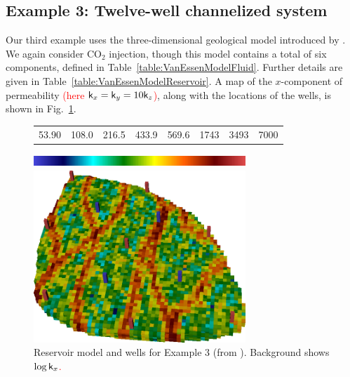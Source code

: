 \documentclass[twocolumn,numbook]{svjour3}          %
\newcommand{\red}[1]{\textcolor{red}{#1}}
\begin{document}
\subsection{Example 3: Twelve-well channelized system}


Our third example uses the three-dimensional geological model introduced by
\cite{VanEssen}. We again consider CO$_2$ injection, though this model
contains a total of six components, defined in
Table~\ref{table:VanEssenModelFluid}. Further details are given in Table~\ref{table:VanEssenModelReservoir}.  A map of
the $x$-component of permeability \red{(here $\mathsf{k}_x = \mathsf{k}_y = 10\mathsf{k}_z$)}, along with the
locations of the wells, is shown in Fig.~\ref{fig:VanEssenModelPermeabilityAndWells}.


\begin{figure}[ht]
     \begin{center}
      \begin{tabular}{cccccccc}
      53.90 & 108.0 & 216.5 & 433.9 & 569.6 & 1743 & 3493 & 7000 
      \end{tabular}
       \includegraphics[width=8cm,height=0.5cm]{VanEssenModelPermeabilityMapColorBar.png}
                                                            
       \medskip
       
       \includegraphics[width=8cm]{VanEssenModelPermeabilityMapConstant.png}%
     \end{center}
     \caption{Reservoir model and wells for Example 3 (from \cite{VanEssen}). Background shows \red{$\log \mathsf{k}_x$.}}
  \label{fig:VanEssenModelPermeabilityAndWells}
\end{figure}
\end{document}
